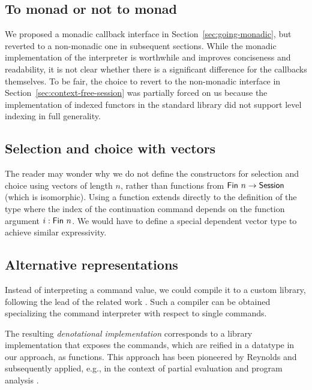 \documentclass[acmsmall,review,anonymous,screen]{acmart}
\begin{document}
\subsection{To monad or not to monad}
\label{sec:monad-or-not}

We proposed a monadic callback interface in Section~\ref{sec:going-monadic},
but reverted to a non-monadic one in subsequent sections. While the
monadic implementation of the interpreter is worthwhile and improves
conciseness and readability, it is not clear whether there is a
significant difference for the callbacks themselves.
To be fair, the choice to revert to the non-monadic interface in
Section~\ref{sec:context-free-session} was partially forced on us because the implementation of indexed functors in
the standard library did not support level indexing in full generality.

\subsection{Selection and choice with vectors}
\label{sec:select-choice-with}

The reader may wonder why we do not define the constructors for
selection and choice using vectors of length $n$, rather than
functions from $\AFin~n \to \ASession$ (which is isomorphic). Using a function extends
directly to the definition of the {\ACommand} type where the {\ASession} index of the
continuation command depends on the function argument $i : \AFin~n$.
We would have to define a special dependent vector type to achieve similar
expressivity. 

\subsection{Alternative representations}
\label{sec:code-generation}

Instead of interpreting a command value, we could compile it to a
custom library, following the lead of the related work
\cite{DBLP:journals/pacmpl/00020HNY20,DBLP:conf/cc/Miu0Y021}.
Such a compiler can be obtained specializing the command interpreter
with respect to single commands.

The resulting \emph{denotational implementation} corresponds to a library implementation that exposes
the commands, which are reified in a datatype in our approach, as
functions. This approach has been pioneered by Reynolds \cite{Reynolds1994} and
subsequently applied, e.g., in the context of partial evaluation and
program analysis
\cite{DBLP:journals/jfp/Thiemann99,DBLP:journals/jfp/CaretteKS09}.
\end{document}
